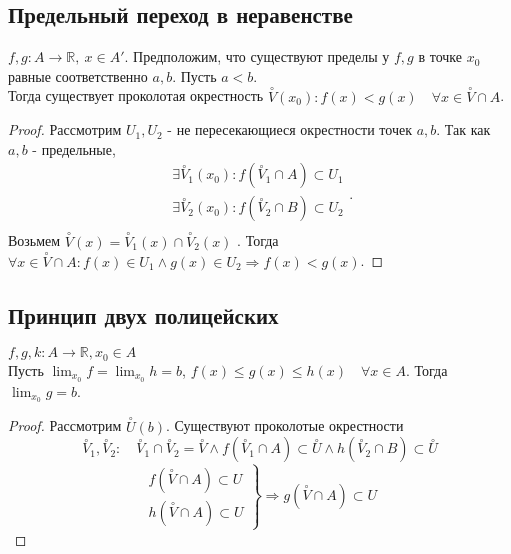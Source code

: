 \documentclass[11pt]{book}
\newcommand{\R}{\mathbb{R}}
\renewcommand{\le}{\leqslant}
\theoremstyle{definition}
\theoremstyle{plain}
\theoremstyle{plain}
\theoremstyle{definition}
\theoremstyle{remark}
\begin{document}
\subsection{Предельный переход в неравенстве}\label{ques_18}
\begin{thm}
    $f, g :A \to \R, ~x \in A'$. Предположим, что существуют пределы у $f, g$ в точке $x_0$ равные соответственно $a, b$. Пусть $a<b$. \\
    Тогда существует проколотая окрестность  $\stackrel \circ V (x_0): f(x) < g(x) \quad \forall x \in \stackrel \circ V \cap A$.
\end{thm}
\begin{proof}
    Рассмотрим $U_1 , U_2$ - не пересекающиеся окрестности точек $a, b$. Так как $a, b$ - предельные, \[
	\begin{array}{c}
	    \exists \stackrel{\circ} V_1 (x_0): f(\stackrel{\circ} V_1 \cap A) \subset U_1 \\
	    \exists \stackrel{\circ} V_2 (x_0): f(\stackrel{\circ} V_2 \cap B) \subset U_2 \\
    \end{array}
    .\] 
    Возьмем $\stackrel{\circ} V(x) = \stackrel{\circ} V_1(x) \cap \stackrel{\circ} V_2(x)$ . Тогда $\forall x \in \stackrel \circ V \cap A: f(x) \in  U_1 \wedge g(x) \in  U_2 \Rightarrow f(x) < g(x)$.
\end{proof}
\subsection{Принцип двух полицейских}\label{ques_19}
\begin{thm}
     $f, g, k: A \to \R, x_0 \in A$ \\
     Пусть $\lim_{x_0} f = \lim_{x_0} h = b$, $f(x) \le g(x) \le h(x) \quad \forall x \in A$.
     Тогда $\lim_{x_0} g = b$.
\end{thm}
\begin{proof}
    Рассмотрим $\stackrel \circ U(b)$. Существуют проколотые окрестности $$\stackrel \circ V_1, \stackrel \circ V_2:\quad \stackrel \circ V_1 \cap \stackrel \circ V_2  = \stackrel \circ V \wedge 
    f(\stackrel \circ V_1\cap A) \subset \stackrel \circ U \wedge h(\stackrel \circ V_2 \cap B) \subset \stackrel \circ U$$
    $$
    \left . 
    \begin{array}{c}
	f(\stackrel \circ V \cap A) \subset U \\
	h(\stackrel \circ V \cap A) \subset U
    \end{array}
\right \} \Rightarrow g(\stackrel \circ V \cap A) \subset U
    $$
\end{proof}
\end{document}
